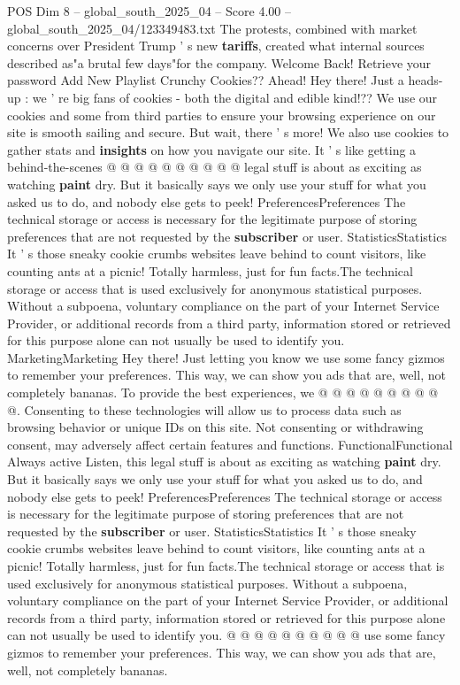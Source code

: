 \begin{textsample}{POS Dim 8 – global\_south\_2025\_04 – Score 4.00 – global\_south\_2025\_04/123349483.txt}
The protests, combined with market concerns over President Trump ' s new \textbf{tariffs}, created what internal sources described as"a brutal few days"for the company.
Welcome Back!
Retrieve your password Add New Playlist Crunchy Cookies??
Ahead!
Hey there!
Just a heads-up : we ' re big fans of cookies - both the digital and edible kind!??
We use our cookies and some from third parties to ensure your browsing experience on our site is smooth sailing and secure.
But wait, there ' s more!
We also use cookies to gather stats and \textbf{insights} on how you navigate our site.
It ' s like getting a behind-the-scenes @ @ @ @ @ @ @ @ @ @ legal stuff is about as exciting as watching \textbf{paint} dry.
But it basically says we only use your stuff for what you asked us to do, and nobody else gets to peek!
PreferencesPreferences The technical storage or access is necessary for the legitimate purpose of storing preferences that are not requested by the \textbf{subscriber} or user.
StatisticsStatistics It ' s those sneaky cookie crumbs websites leave behind to count visitors, like counting ants at a picnic!
Totally harmless, just for fun facts.The technical storage or access that is used exclusively for anonymous statistical purposes.
Without a subpoena, voluntary compliance on the part of your Internet Service Provider, or additional records from a third party, information stored or retrieved for this purpose alone can not usually be used to identify you.
MarketingMarketing Hey there!
Just letting you know we use some fancy gizmos to remember your preferences.
This way, we can show you ads that are, well, not completely bananas.
To provide the best experiences, we @ @ @ @ @ @ @ @ @ @.
Consenting to these technologies will allow us to process data such as browsing behavior or unique IDs on this site.
Not consenting or withdrawing consent, may adversely affect certain features and functions.
FunctionalFunctional Always active Listen, this legal stuff is about as exciting as watching \textbf{paint} dry.
But it basically says we only use your stuff for what you asked us to do, and nobody else gets to peek!
PreferencesPreferences The technical storage or access is necessary for the legitimate purpose of storing preferences that are not requested by the \textbf{subscriber} or user.
StatisticsStatistics It ' s those sneaky cookie crumbs websites leave behind to count visitors, like counting ants at a picnic!
Totally harmless, just for fun facts.The technical storage or access that is used exclusively for anonymous statistical purposes.
Without a subpoena, voluntary compliance on the part of your Internet Service Provider, or additional records from a third party, information stored or retrieved for this purpose alone can not usually be used to identify you. @ @ @ @ @ @ @ @ @ @ use some fancy gizmos to remember your preferences.
This way, we can show you ads that are, well, not completely bananas.

\end{textsample}
